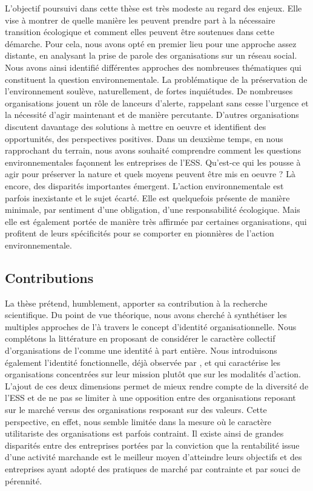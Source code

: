 L'objectif poursuivi dans cette thèse est très modeste au regard des enjeux. Elle vise à montrer de quelle manière les \oess peuvent prendre part à la nécessaire transition écologique et comment elles peuvent être soutenues dans cette démarche. Pour cela, nous avons opté en premier lieu pour une approche assez distante, en analysant la prise de parole des organisations sur un réseau social. Nous avons ainsi identifié différentes approches des nombreuses thématiques qui constituent la question environnementale. La problématique de la préservation de l'environnement soulève, naturellement, de fortes inquiétudes. De nombreuses organisations jouent un rôle de lanceurs d'alerte, rappelant sans cesse l'urgence et la nécessité d'agir maintenant et de manière percutante. D'autres organisations discutent davantage des solutions à mettre en oeuvre et identifient des opportunités, des perspectives positives. Dans un deuxième temps, en nous rapprochant du terrain, nous avons souhaité comprendre comment les questions environnementales façonnent les entreprises de l'ESS. Qu'est-ce qui les pousse à agir pour préserver la nature et quels moyens peuvent être mis en oeuvre ? Là encore, des disparités importantes émergent. L'action environnementale est parfois inexistante et le sujet écarté. Elle est quelquefois présente de manière minimale, par sentiment d'une obligation, d'une responsabilité écologique. Mais elle est également portée de manière très affirmée par certaines organisations, qui profitent de leurs spécificités pour se comporter en pionnières de l'action environnementale.

\subsection*{Contributions}
La thèse prétend, humblement, apporter sa contribution à la recherche scientifique. Du point de vue théorique, nous avons cherché à synthétiser les multiples approches de l'\ess à travers le concept d'identité organisationnelle. Nous complétons la littérature en proposant de considérer le caractère collectif d'organisations de l'\ess comme une identité à part entière. Nous introduisons également l'identité fonctionnelle, déjà observée par \textcite{young2001organizational, young2000alternative}, et qui caractérise les organisations concentrées sur leur mission plutôt que sur les modalités d'action. L'ajout de ces deux dimensions permet de mieux rendre compte de la diversité de l'ESS et de ne pas se limiter à une opposition entre des organisations reposant sur le marché versus des organisations resposant sur des valeurs. Cette perspective, en effet, nous semble limitée dans la mesure où le caractère utilitariste des organisations est parfois contraint. Il existe ainsi de grandes disparités entre des entreprises portées par la conviction que la rentabilité issue d'une activité marchande est le meilleur moyen d'atteindre leurs objectifs et des entreprises ayant adopté des pratiques de marché par contrainte et par souci de pérennité. \\

